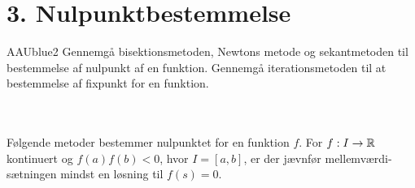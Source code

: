 \section*{3. Nulpunktbestemmelse}
%
\begin{color}{AAUblue2}
%
Gennemgå bisektionsmetoden, Newtons metode og sekantmetoden til bestemmelse af nulpunkt af en funktion. 
Gennemgå iterationsmetoden til at bestemmelse af fixpunkt for en funktion.
%
\end{color}
%
\\\\ 
%
%
Følgende metoder bestemmer nulpunktet for en funktion $f$.
For $f:I\rightarrow\mathbb{R}$ kontinuert og $f(a)f(b)<0$, hvor $I=[a,b]$, er der jævnfør mellemværdi-sætningen mindst en løsning til $f(s)=0$.
% 
%

